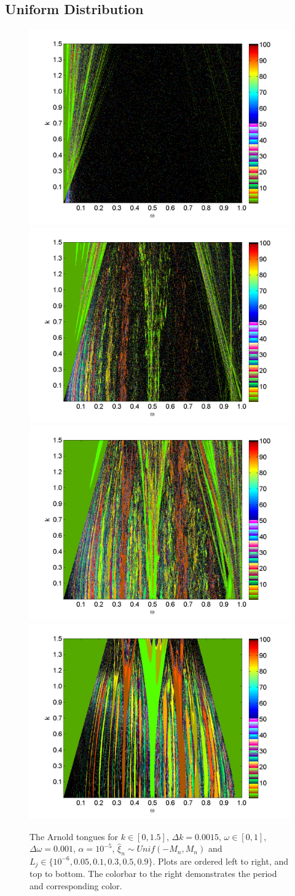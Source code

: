 \subsection{Uniform Distribution}
\begin{figure}[H]\linespread{1}  
\caption[The Arnold tongues for the random circle map, uniform distribution]{The Arnold
  tongues for $k\in [0,1.5]$, $\Delta k = 0.0015$, $\omega \in [0,1]$,
  $\Delta \omega = 0.001$, $\alpha = 10^{-5}$, $\hat{\xi}_n\sim Unif(-M_n,M_n)$ and $L_j \in
  \{10^{-6},0.05,0.1,0.3,0.5,0.9\}$. Plots are ordered left to right, and top to bottom. The colorbar
to the right demonstrates the period and corresponding color.}\label{fig:rcirctongues_u}
\centering
\includegraphics[width=.5\textwidth]{figs/tongues_1000_L_1e-05.png}\hfill
\includegraphics[width=.5\textwidth]{figs/tongues_1000_L_005.png}\\
\includegraphics[width=.5\textwidth]{figs/tongues_1000_L_01.png}\hfill
\includegraphics[width=.5\textwidth]{figs/tongues_1000_L_03.png}\\

\end{figure}
